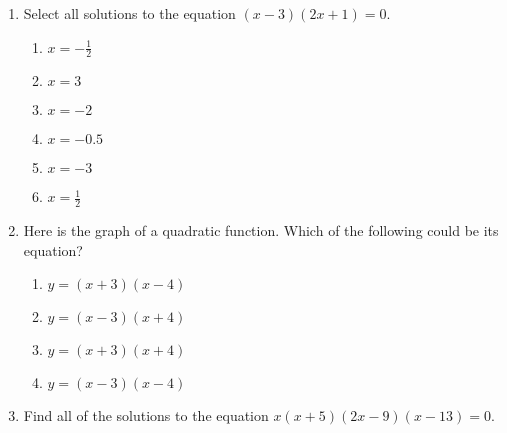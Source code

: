 \documentclass[12pt, twoside]{article}
\begin{document}
\begin{enumerate}
\newpage
\item Select all solutions to the equation $(x-3)(2x+1)=0$.
    \begin{multicols}{2}
    \begin{enumerate}
        \item $x=-\frac{1}{2}$
        \item $x=3$
        \item $x=-2$
        \item $x=-0.5$
        \item $x=-3$
        \item $x=\frac{1}{2}$
    \end{enumerate}
    \end{multicols}
    \vspace{0.25cm}

\item Here is the graph of a quadratic function. Which of the following could be its equation?
    \begin{center}
    \end{center}
    \begin{multicols}{2}
    \begin{enumerate}
        \item $y=(x+3)(x-4)$
        \item $y=(x-3)(x+4)$
        \item $y=(x+3)(x+4)$
        \item $y=(x-3)(x-4)$
    \end{enumerate}
    \end{multicols}

\item Find all of the solutions to the equation $x(x+5)(2x-9)(x-13)=0$. 

\newpage


\end{enumerate}
\end{document}
